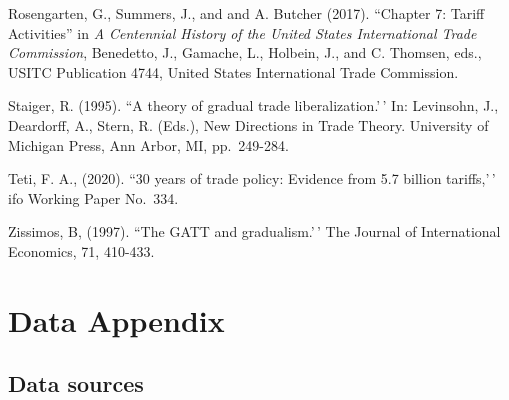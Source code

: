 \documentclass[
  12pt,
]{article}
\begin{document}
Rosengarten, G., Summers, J., and and A. Butcher (2017). ``Chapter 7: Tariff Activities'' in \emph{A Centennial History of the United States International Trade Commission}, Benedetto, J., Gamache, L., Holbein, J., and C. Thomsen, eds., USITC Publication 4744, United States International Trade Commission.

Staiger, R. (1995). ``A theory of gradual trade liberalization.'\,' In: Levinsohn, J., Deardorff, A., Stern, R. (Eds.), New Directions in Trade Theory. University of Michigan Press, Ann Arbor, MI, pp.~249-284.

Teti, F. A., (2020). ``30 years of trade policy: Evidence from 5.7 billion tariffs,'\,' ifo Working Paper No.~334.

Zissimos, B, (1997). ``The GATT and gradualism.'\,' The Journal of International Economics, 71, 410-433.

\hypertarget{dataappendix}{%
\section{Data Appendix}\label{dataappendix}}

\hypertarget{sources}{%
\subsection{Data sources}\label{sources}}
\end{document}
